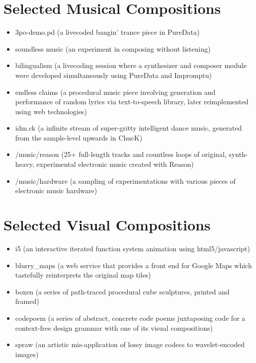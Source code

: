 \documentclass[12pt]{article}
\begin{document}
\section*{Selected Musical Compositions}
\begin{itemize}
  \item 3po-demo.pd (a livecoded bangin' trance piece in PureData)
  \item soundless music (an experiment in composing without listening)
  \item bilingualism (a livecoding session where a synthesizer and composer module were developed simultaneously using PureData and Impromptu)
  \item endless claims (a procedural music piece involving generation and performance of random lyrics via text-to-speech library, later reimplemented using web technologies)
  \item idm.ck (a infinite stream of super-gritty intelligent dance music, generated from the sample-level upwards in ChucK) 
  \item /music/reason (25+ full-length tracks and countless loops of original, synth-heavy, experimental electronic music created with Reason) 
  \item /music/hardware (a sampling of experimentations with various pieces of electronic music hardware)
\end{itemize}

\section*{Selected Visual Compositions}
\begin{itemize}
  \item i5 (an interactive iterated function system animation using html5/javascript)
  \item blurry\_maps (a web service that provides a front end for Google Maps which tastefully reinterprets the original map tiles)
  \item boxen (a series of path-traced procedural cube sculptures, printed and framed)
  \item codepoem (a series of abstract, concrete code poems juxtaposing code for a context-free design grammar with one of its visual compositions)
  \item spraw (an artistic mis-application of lossy image codecs to wavelet-encoded images)
\end{itemize}

\newpage
\end{document}
